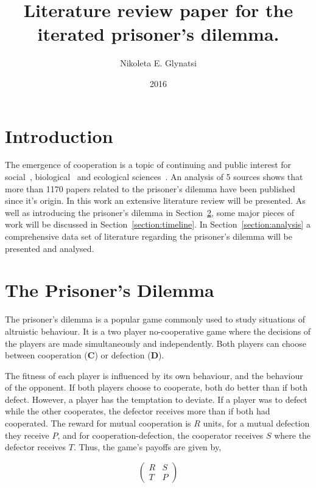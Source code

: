 \documentclass{article}
\title{Literature review paper for the iterated prisoner's dilemma.}
\author{Nikoleta E. Glynatsi}
\date{2016}
\begin{document}
\maketitle

\section{Introduction}\label{section:introduction}


The emergence of cooperation is a topic of continuing and public interest
for social~\cite{capraro2014, gracia2012},
biological~\cite{Douglas2011}
and ecological sciences~\cite{Godfray1992,Krama2012,Milinski1987,Wilkinson1984}.
An analysis of 5 sources shows that more than 1170 papers related to the 
prisoner's dilemma have been published since it's origin. In this work an 
extensive literature review will be presented. As well as introducing the 
prisoner's dilemma in Section~\ref{section:prisoners_dilemma}, some major pieces
of work will be discussed in Section~\ref{section:timeline}. 
In Section~\ref{section:analysis} a comprehensive data set of literature 
regarding the prisoner's dilemma will be presented and analysed.

\section{The Prisoner's Dilemma}\label{section:prisoners_dilemma}

The prisoner's dilemma is a popular game commonly used to study situations
of altruistic behaviour. It is a two player no-cooperative game where the decisions
of the players are made simultaneously and independently. Both players can
choose between cooperation (\textbf{C}) or defection (\textbf{D}).

The fitness of each player is influenced by its own behaviour, and the behaviour
of the opponent. If both players choose to cooperate, both do better
than if both defect. However, a player has the temptation to deviate. If a
player was to defect while the other cooperates, the defector receives
more than if both had cooperated. The reward for mutual cooperation is \(R\)
units, for a mutual defection they receive \(P\), and for cooperation-defection,
the cooperator receives \(S\) where the defector receives \(T\). Thus, the game's
payoffs are given by,

\begin{equation} \label{eq:the_pd_payoffs}
	\begin{pmatrix} 
	R & S \\ T & P
	\end{pmatrix}
\end{equation}
\end{document}
